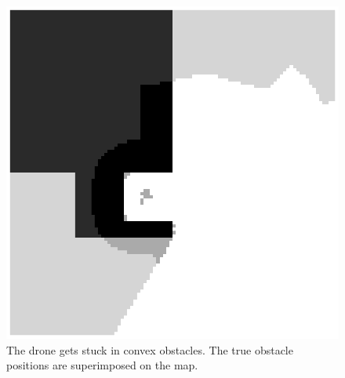\begin{figure}
    \centering
    \includegraphics[width = \linewidth]{Figures/convex_obstacle.eps}
    \caption{The drone gets stuck in convex obstacles. The true obstacle positions are superimposed on the map.}
    \label{fig:convex_obstacle}
\end{figure}



